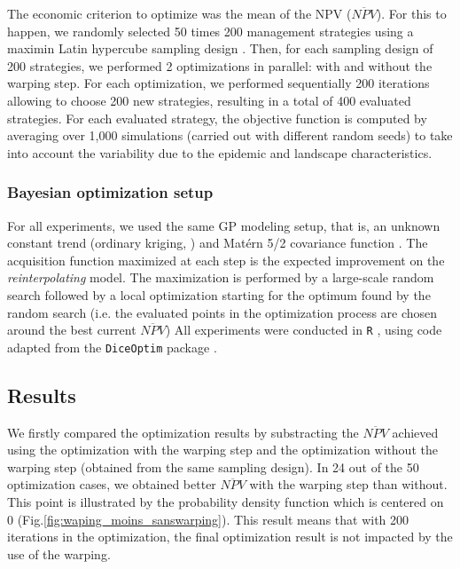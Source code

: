 The economic criterion to optimize was the mean of the NPV ($\overline{NPV}$).
For this to happen, we randomly selected 50 times 200 management strategies using a maximin Latin hypercube sampling design \cite{fang2005design}. 
Then, for each sampling design of 200 strategies, we performed 2 optimizations in parallel: with and without the warping step. 
For each optimization, we performed sequentially 200 iterations allowing to choose 200 new strategies, resulting in a total of 400 evaluated strategies.
For each evaluated strategy, the objective function is computed by averaging over 1,000 simulations (carried out with different random seeds) 
to take into account the variability due to the epidemic and landscape characteristics.

\subsubsection{Bayesian optimization setup}
For all experiments, we used the same GP modeling setup, that is, an unknown constant trend (ordinary kriging, \cite{matheron1963principles}) and 
Mat\'ern 5/2 covariance function \cite[][Chapter 4]{Rasmussen2006}. The acquisition function maximized at each step is the expected improvement on the 
\textit{reinterpolating} model. The maximization is performed by a large-scale random search followed by a local optimization starting for the optimum found by the random search (i.e. the evaluated points in the optimization process are chosen around the best current $\overline{NPV}$)
All experiments were conducted in \texttt{R} \cite{R2018}, using code adapted from the \texttt{DiceOptim} package \cite{picheny2014noisy}.

\subsection{Results}
We firstly compared the optimization results by substracting the $\overline{NPV}$ achieved using the optimization with the warping step and the optimization without the warping step (obtained from the same sampling design). 
In 24 out of the 50 optimization cases, we obtained better $\overline{NPV}$ with the warping step than without. This point is illustrated by the probability density function which is centered on 0 (Fig.\ref{fig:waping_moins_sanswarping}).
This result means that with 200 iterations in the optimization, the final optimization result is not impacted by the use of the warping.

